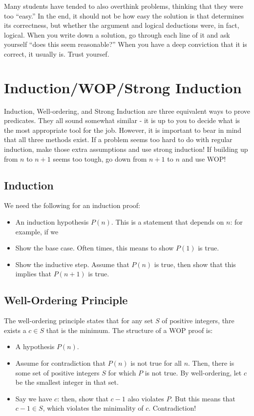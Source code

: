\documentclass[11pt]{article}
\begin{document}
Many students have tended to also overthink problems, thinking that they were too ``easy.'' In the end, it should not be how easy the solution is that determines its correctness, but whether the argument and logical deductions were, in fact, logical.  When you write down a solution, go through each line of it and ask yourself ``does this seem reasonable?''  When you have a deep conviction that it is correct, it usually is.  Trust yoursef.  

\section{Induction/WOP/Strong Induction}

Induction, Well-ordering, and Strong Induction are three equivalent ways to prove predicates.  They all sound somewhat similar - it is up to you to decide what is the most appropriate tool for the job.  However, it is important to bear in mind that all three methods exist.  If a problem seems too hard to do with regular induction, make those extra assumptions and use strong induction!  If building up from $n$ to $n+1$ seems too tough, go down from $n+1$ to $n$ and use WOP!

\subsection{Induction}
	We need the following for an induction proof:
	\begin{itemize}
		\item An induction hypothesis $P(n)$.  This is a statement that depends on $n$: for
		example, if we
		\item Show the base case.  Often times, this means to show $P(1)$ is true.
		\item Show the inductive step.  Assume that $P(n)$ is true, then show that this
		implies that $P(n+1)$ is true. 
		
	\end{itemize}
\subsection{Well-Ordering Principle}
	The well-ordering principle states that for any set $S$ of positive integers, thre exists a $c \in S$ that is the minimum.  The structure of a WOP proof is:
	
	\begin{itemize}
		\item A hypothesis $P(n)$.
		\item Assume for contradiction that $P(n)$ is not true for all $n$.  Then, there is some set of positive integers $S$ for which $P$ is not true.  By well-ordering, let $c$ be the smallest integer in that set.
		\item Say we have $c$: then, show that $c-1$ also violates $P$.  But this means that $c-1 \in S$, which violates the minimality of $c$.  Contradiction!   
	\end{itemize}
\end{document}
